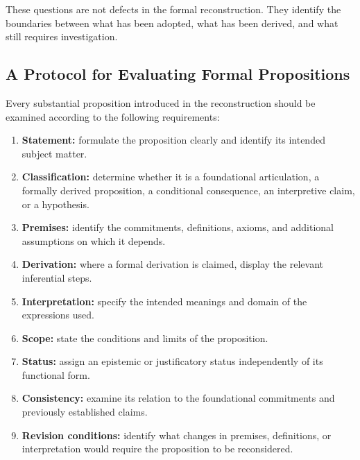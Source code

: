 These questions are not defects in the formal reconstruction.
They identify the boundaries between what has been adopted,
what has been derived, and what still requires investigation.

\subsection{A Protocol for Evaluating Formal Propositions}

Every substantial proposition introduced in the reconstruction
should be examined according to the following requirements:

\begin{enumerate}
    \item \textbf{Statement:} formulate the proposition clearly
    and identify its intended subject matter.

    \item \textbf{Classification:} determine whether it is a
    foundational articulation, a formally derived proposition,
    a conditional consequence, an interpretive claim, or a
    hypothesis.

    \item \textbf{Premises:} identify the commitments,
    definitions, axioms, and additional assumptions on which
    it depends.

    \item \textbf{Derivation:} where a formal derivation is
    claimed, display the relevant inferential steps.

    \item \textbf{Interpretation:} specify the intended meanings
    and domain of the expressions used.

    \item \textbf{Scope:} state the conditions and limits of
    the proposition.

    \item \textbf{Status:} assign an epistemic or justificatory
    status independently of its functional form.

    \item \textbf{Consistency:} examine its relation to the
    foundational commitments and previously established claims.

    \item \textbf{Revision conditions:} identify what changes
    in premises, definitions, or interpretation would require
    the proposition to be reconsidered.
\end{enumerate}


